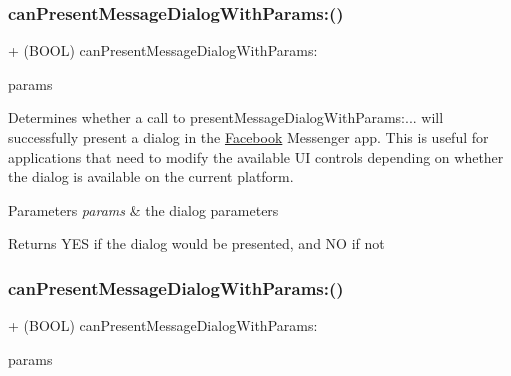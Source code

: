 \subsubsection{\texorpdfstring{can\+Present\+Message\+Dialog\+With\+Params\+:()}{canPresentMessageDialogWithParams:()}\hspace{0.1cm}{\footnotesize\ttfamily [4/5]}}
{\footnotesize\ttfamily + (B\+O\+OL) can\+Present\+Message\+Dialog\+With\+Params\+: \begin{DoxyParamCaption}\item[{(\hyperlink{interfaceFBLinkShareParams}{F\+B\+Link\+Share\+Params} $\ast$)}]{params }\end{DoxyParamCaption}}

Determines whether a call to {\ttfamily present\+Message\+Dialog\+With\+Params\+:...} will successfully present a dialog in the \hyperlink{interfaceFacebook}{Facebook} Messenger app. This is useful for applications that need to modify the available UI controls depending on whether the dialog is available on the current platform.


\begin{DoxyParams}{Parameters}
{\em params} & the dialog parameters\\
\hline
\end{DoxyParams}
\begin{DoxyReturn}{Returns}
Y\+ES if the dialog would be presented, and NO if not 
\end{DoxyReturn}
\mbox{\label{interfaceFBDialogs_a81544299ca98179464ec34fc0e8d12b7}} 
\subsubsection{\texorpdfstring{can\+Present\+Message\+Dialog\+With\+Params\+:()}{canPresentMessageDialogWithParams:()}\hspace{0.1cm}{\footnotesize\ttfamily [5/5]}}
{\footnotesize\ttfamily + (B\+O\+OL) can\+Present\+Message\+Dialog\+With\+Params\+: \begin{DoxyParamCaption}\item[{(\hyperlink{interfaceFBLinkShareParams}{F\+B\+Link\+Share\+Params} $\ast$)}]{params }\end{DoxyParamCaption}}


